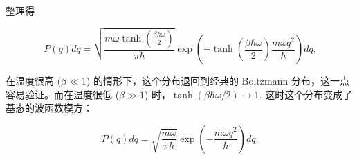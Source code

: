 整理得
\begin{linenomath}
    \begin{equation}
        \boxed{
        P\left( q \right) dq = \sqrt{\frac{m\omega\tanh\left( \frac{\beta\hbar\omega}{2} \right)}{\pi\hbar}}\exp\left( -\tanh\left( \frac{\beta\hbar\omega}{2} \right) \frac{m\omega q^2}{\hbar} \right) dq.}
    \end{equation}
\end{linenomath}
在温度很高 ($\beta \ll 1$) 的情形下，这个分布退回到经典的 Boltzmann 分布，这一点容易验证。而在温度很低 ($\beta \gg 1$) 时，$\tanh \left( \beta\hbar\omega/2 \right)\to 1.$ 这时这个分布变成了基态的波函数模方：
\begin{linenomath}
    \begin{equation}
        P(q) dq = \sqrt{\frac{m\omega}{\pi\hbar}} \exp\left( -\frac{m\omega q^2}{\hbar} \right) dq.
    \end{equation}
\end{linenomath}

